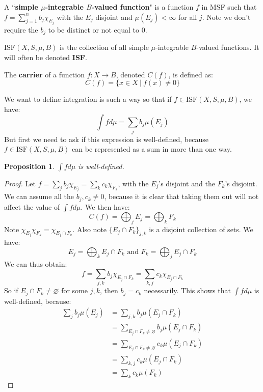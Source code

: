 \documentclass[a4paper,12pt]{report}
\newtheorem{prop}[theorem]{Proposition}
\newenvironment{definition}[1][Definition.]{\begin{trivlist}
\item[\hskip \labelsep {\bfseries #1}]}{\end{trivlist}}
\begin{document}
	\begin{definition}
	A ``\textbf{simple $\mu$-integrable $B$-valued function}" is a function $f$ in MSF such that $f = \sum_{j=1}^n b_j \chi_{E_j}$ with the $E_j$ disjoint and $\mu(E_j) < \infty$ for all $j$. Note we don't require the $b_j$ to be distinct or not equal to 0. 
	\end{definition}
	
	\begin{definition}
	$\text{ISF}(X, S, \mu, B)$ is the collection of all simple $\mu$-integrable $B$-valued functions. It will often be denoted \textbf{ISF}.
	\end{definition}
	\begin{definition}
	The \textbf{carrier} of a function $f : X \rightarrow B$, denoted $C(f)$, is defined as:
	\[ C(f) = \{ x \in X ~|~ f(x) \neq 0 \} \]
	\end{definition}
	
	\noindent We want to define integration is such a way so that if $f \in \text{ISF}(X, S, \mu ,B)$, we have:
	\[ \int f d\mu = \sum_j b_j \mu(E_j) \]
	But first we need to ask if this expression is well-defined, because $f \in \text{ISF}(X, S, \mu, B)$ can be represented as a sum in more than one way. 
	
	\begin{prop}
	$\int f d\mu$ is well-defined. 
	\end{prop}
	\begin{proof}
	Let $f = \sum_j b_j\chi_{E_j} = \sum_k c_k \chi_{F_k}$, with the $E_j$'s disjoint and the $F_k$'s disjoint. We can assume all the $b_j, c_k \neq 0$, because it is clear that taking them out will not affect the value of $\int f d\mu$. We then have:
	\[ C(f) = \bigoplus_j E_j = \bigoplus_k F_k \]
	Note $\chi_{E_j} \chi_{F_k} = \chi_{E_j \cap F_k}$. Also note $\{E_j \cap F_k\}_{j,k}$ is a disjoint collection of sets. We have:
	\[ E_j = \bigoplus_k E_j \cap F_k \text{ and } F_k = \bigoplus_j E_j \cap F_k \]
	We can thus obtain:
	\[ f = \sum_{j, k} b_j \chi_{E_j \cap F_k} = \sum_{k, j} c_k \chi_{E_j \cap F_k} \]
	So if $E_j \cap F_k \neq \varnothing$ for some $j, k$, then $b_j = c_k$ necessarily. This shows that $\int f d\mu$ is well-defined, because:
	\begin{align*}
	\sum_j b_j \mu(E_j) &= \sum_{j, k} b_j \mu(E_j \cap F_k) \\
	&= \sum_{E_j \cap F_k \neq \varnothing} b_j \mu(E_j \cap F_k) \\
	&= \sum_{E_j \cap F_k \neq \varnothing} c_k \mu(E_j \cap F_k) \\
	&= \sum_{k, j} c_k \mu(E_j \cap F_k) \\ 
	&= \sum_k c_k \mu(F_k)
	\end{align*}
	\end{proof} 
	
\end{document}
